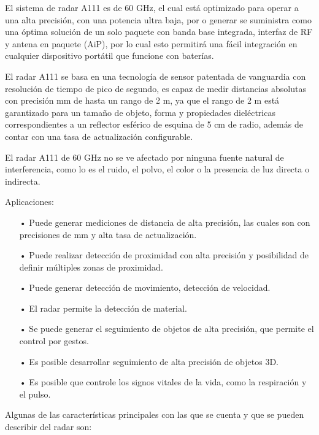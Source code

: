 El sistema de radar A111 es de 60 GHz, el cual está optimizado para operar a una alta precisión, con una potencia ultra baja, por o generar se suministra como una óptima solución de un solo paquete con banda base integrada, interfaz de RF y antena en paquete (AiP), por lo cual esto permitirá una fácil integración en cualquier dispositivo portátil que funcione con baterías.

El radar A111 se basa en una tecnología de sensor patentada de vanguardia con resolución de tiempo de pico de segundo, es capaz de medir distancias absolutas con precisión mm de hasta un rango de 2 m, ya que el rango de 2 m está garantizado para un tamaño de objeto, forma y propiedades dieléctricas correspondientes a un reflector esférico de esquina de 5 cm de radio, además de contar con una tasa de actualización configurable.

El radar A111 de 60 GHz no se ve afectado por ninguna fuente natural de interferencia, como lo es el ruido, el polvo, el color o la presencia de luz directa o indirecta.


Aplicaciones:
\begin{itemize}
	\item[•] Puede generar mediciones de distancia de alta precisión, las cuales son con precisiones de mm y alta tasa de actualización.
	\item[•] Puede realizar detección de proximidad con alta precisión y posibilidad de definir múltiples zonas de proximidad.
	\item[•] Puede generar detección de movimiento, detección de velocidad.
	\item[•] El radar permite la detección de material.
	\item[•] Se puede generar el seguimiento de objetos de alta precisión, que permite el control por gestos.
	\item[•] Es posible desarrollar seguimiento de alta precisión de objetos 3D.
	\item[•] Es posible que controle los signos vitales de la vida, como la respiración y el pulso.
\end{itemize}

Algunas de las características principales con las que se cuenta y que se pueden describir del radar son:

